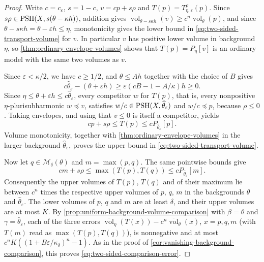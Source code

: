 \begin{proof}
Write $c=c_\varepsilon$, $s=1-c$, $v=cp+s\rho$ and $T(p)=T^\rho_{\eta,\varepsilon}(p)$. Since $s\rho\in\mathrm{PSH}(X,s(\theta-\kappa h))$, addition gives $\operatorname{vol}_{\theta-s\kappa h}(v)\geq c^n\operatorname{vol}_\theta(p)$, and since $\theta-s\kappa h=\theta-\varepsilon h\leq\eta$, monotonicity gives the lower bound in \eqref{eq:two-sided-transport-volume} for $v$. In particular $v$ has positive lower volume in background $\eta$, so \cref{thm:ordinary-envelope-volumes} shows that $T(p)=P_\eta[v]$ is an ordinary model with the same two volumes as $v$.

Since $\varepsilon<\kappa/2$, we have $c\geq1/2$, and $\theta\leq Ah$ together with the choice of $B$ gives
\begin{equation}\label{eq:two-sided-transport-form}
 c\widehat\theta_\varepsilon-(\theta+\varepsilon h)
 \geq\varepsilon(cB-1-A/\kappa)h\geq0.
\end{equation}
Since $\eta\leq\theta+\varepsilon h\leq c\widehat\theta_\varepsilon$, every competitor $w$ for $T(p)$, that is, every nonpositive $\eta$-plurisubharmonic $w\preceq v$, satisfies $w/c\in\mathrm{PSH}(X,\widehat\theta_\varepsilon)$ and $w/c\preceq p$, because $\rho\leq0$. Taking envelopes, and using that $v\leq0$ is itself a competitor, yields
\begin{equation}\label{eq:two-sided-transport-bounds}
 cp+s\rho\leq T(p)\leq cP_{\widehat\theta_\varepsilon}[p].
\end{equation}
Volume monotonicity, together with \cref{thm:ordinary-envelope-volumes} in the larger background $\widehat\theta_\varepsilon$, proves the upper bound in \eqref{eq:two-sided-transport-volume}.

Now let $q\in\mathcal M_\delta(\theta)$ and $m=\max(p,q)$. The same pointwise bounds give
\[
 cm+s\rho\leq\max(T(p),T(q))
       \leq cP_{\widehat\theta_\varepsilon}[m].
\]
Consequently the upper volumes of $T(p)$, $T(q)$ and of their maximum lie between $c^n$ times the respective upper volumes of $p$, $q$, $m$ in the backgrounds $\theta$ and $\widehat\theta_\varepsilon$. The lower volumes of $p$, $q$ and $m$ are at least $\delta$, and their upper volumes are at most $K$. By \cref{prop:uniform-background-volume-comparison} with $\beta=\theta$ and $\gamma=\widehat\theta_\varepsilon$, each of the three errors $\overline{\operatorname{vol}}_\eta(T(x))-c^n\overline{\operatorname{vol}}_\theta(x)$, $x=p,q,m$ (with $T(m)$ read as $\max(T(p),T(q))$), is nonnegative and at most $c^nK((1+B\varepsilon/\kappa_\delta)^n-1)$. As in the proof of \cref{cor:vanishing-background-comparison}, this proves \eqref{eq:two-sided-comparison-error}.


\end{proof}
